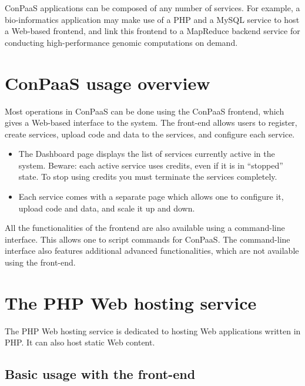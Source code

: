 \documentclass[10pt]{article}
\begin{document}
ConPaaS applications can be composed of any number of services. For
example, a bio-informatics application may make use of a PHP and a
MySQL service to host a Web-based frontend, and link this frontend to
a MapReduce backend service for conducting high-performance genomic
computations on demand.

\section{ConPaaS usage overview}

Most operations in ConPaaS can be done using the ConPaaS frontend,
which gives a Web-based interface to the system. The front-end allows
users to register, create services, upload code and data to the
services, and configure each service. 

\begin{itemize}
\item The Dashboard page displays the list of services currently
  active in the system. Beware: each active service uses credits, even
  if it is in ``stopped'' state. To stop using credits you must
  terminate the services completely.
\item Each service comes with a separate page which allows one to
  configure it, upload code and data, and scale it up and down.
\end{itemize}

All the functionalities of the frontend are also available using a
command-line interface. This allows one to script commands for
ConPaaS. The command-line interface also features additional advanced
functionalities, which are not available using the front-end.

\section{The PHP Web hosting service}

The PHP Web hosting service is dedicated to hosting Web applications
written in PHP. It can also host static Web content.

\subsection{Basic usage with the front-end}
\end{document}
